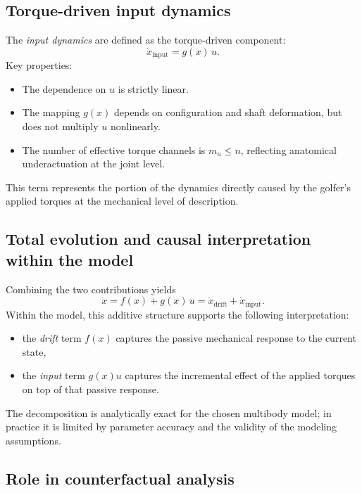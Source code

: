 \documentclass[12pt]{article}
\newcommand{\xd}{\dot{x}}
\begin{document}
\subsection{Torque-driven input dynamics}

The \emph{input dynamics} are defined as the torque-driven component:
\begin{equation}
  \xd_{\text{input}} = g(x)\,u.
\end{equation}
Key properties:
\begin{itemize}
  \item The dependence on \(u\) is strictly linear.
  \item The mapping \(g(x)\) depends on configuration and shaft deformation, but does not multiply \(u\) nonlinearly.
  \item The number of effective torque channels is \(m_{u} \le n\), reflecting anatomical underactuation at the joint level.
\end{itemize}
This term represents the portion of the dynamics directly caused by the golfer's applied torques at the mechanical level of description.

\subsection{Total evolution and causal interpretation within the model}

Combining the two contributions yields
\begin{equation}
  \xd = f(x) + g(x)\,u = \xd_{\text{drift}} + \xd_{\text{input}}.
\end{equation}
Within the model, this additive structure supports the following interpretation:
\begin{itemize}
  \item the \emph{drift} term \(f(x)\) captures the passive mechanical response to the current state,
  \item the \emph{input} term \(g(x)u\) captures the incremental effect of the applied torques on top of that passive response.
\end{itemize}
The decomposition is analytically exact for the chosen multibody model; in practice it is limited by parameter accuracy and the validity of the modeling assumptions.

\subsection{Role in counterfactual analysis}
\end{document}
